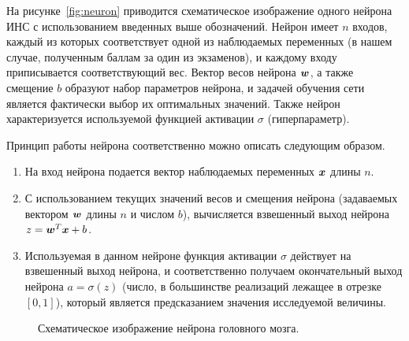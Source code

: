 \documentclass[a4paper,12pt,russian]{article} %
\begin{document}
На рисунке~\ref{fig:neuron} приводится схематическое изображение одного нейрона ИНС с использованием введенных выше обозначений.
Нейрон имеет $n$ входов, каждый из которых соответствует одной из наблюдаемых переменных (в нашем случае, полученным баллам за один из экзаменов), и каждому входу приписывается соответствующий вес.
Вектор весов нейрона $\bm{w}$, а также смещение $b$ образуют набор параметров нейрона, и задачей обучения сети является фактически выбор их оптимальных значений.
Также нейрон характеризуется используемой функцией активации $\sigma$ (гиперпараметр).

Принцип работы нейрона соответственно можно описать следующим образом.
\begin{enumerate}
	\item На вход нейрона подается вектор наблюдаемых переменных $\bm{x}$ длины $n$.
	\item С использованием текущих значений весов и смещения нейрона (задаваемых вектором $\bm{w}$ длины $n$ и числом $b$), вычисляется взвешенный выход нейрона $z = \bm{w}^T \bm{x} + b$.
	\item Используемая в данном нейроне функция активации $\sigma$ действует на взвешенный выход нейрона, и соответственно получаем окончательный выход нейрона $a = \sigma(z)$ (число, в большинстве реализаций лежащее в отрезке $[0, 1]$), который является предсказанием значения исследуемой величины.
\end{enumerate}

\begin{figure}[t!]
	\caption{
		Схематическое изображение нейрона головного мозга.
        }
        \label{fig:neuron_real}
\end{figure}
\end{document}
